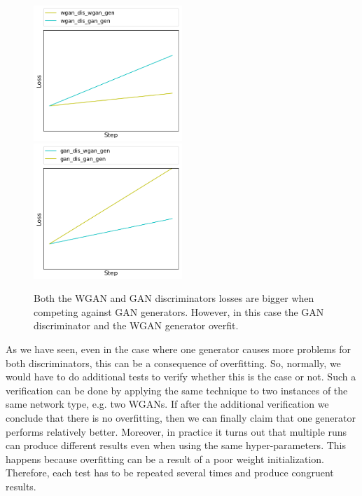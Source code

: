 	\begin{figure}[h!] 
		\includegraphics[width=0.5\textwidth]{figures/ex/gen_dis_overfit_wgan_dis}
		\includegraphics[width=0.5\textwidth]{figures/ex/gen_dis_overfit_gan_dis}
		\caption{Both the WGAN and GAN discriminators losses are bigger when competing against GAN generators. However, in this case the GAN discriminator and the WGAN generator overfit.}
		\label{fig:cd_gen_dis_overfit}
	\end{figure}
As we have seen, even in the case where one generator causes more problems for both discriminators, this can be a consequence of overfitting. So, normally, we would have to do additional tests to verify whether this is the case or not. Such a verification can be done by applying the same technique to two instances of the same network type, e.g. two WGANs. If after the additional verification we conclude that there is no overfitting, then we can finally claim that one generator performs relatively better. Moreover, in practice it turns out that multiple runs can produce different results even when using the same hyper-parameters. This happens because overfitting can be a result of a poor weight initialization. Therefore, each test has to be repeated several times and produce congruent results. 

